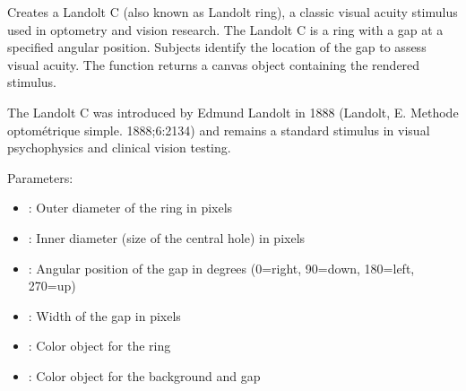 \documentclass[letterpaper,10pt,english]{sphinxmanual}
\begin{document}
\sphinxAtStartPar
{}

\sphinxAtStartPar
Creates a Landolt C (also known as Landolt ring), a classic visual acuity stimulus used in optometry and vision research. The Landolt C is a ring with a gap at a specified angular position. Subjects identify the location of the gap to assess visual acuity. The function returns a canvas object containing the rendered stimulus.

\sphinxAtStartPar
The Landolt C was introduced by Edmund Landolt in 1888 (Landolt, E. Methode optométrique simple.  1888;6:213\textendash{}4) and remains a standard stimulus in visual psychophysics and clinical vision testing.

\sphinxAtStartPar
Parameters:
\begin{itemize}
\item {} 
\sphinxAtStartPar
{}: Outer diameter of the ring in pixels

\item {} 
\sphinxAtStartPar
{}: Inner diameter (size of the central hole) in pixels

\item {} 
\sphinxAtStartPar
{}: Angular position of the gap in degrees (0=right, 90=down, 180=left, 270=up)

\item {} 
\sphinxAtStartPar
{}: Width of the gap in pixels

\item {} 
\sphinxAtStartPar
{}: Color object for the ring

\item {} 
\sphinxAtStartPar
{}: Color object for the background and gap

\end{itemize}

\sphinxAtStartPar
{}

\begin{sphinxVerbatim}[commandchars=\\\{\}]
\end{sphinxVerbatim}
\end{document}

